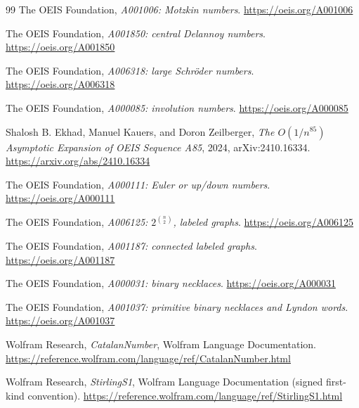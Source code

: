 \documentclass[11pt,a4paper]{article}
\numberwithin{equation}{section}
\theoremstyle{definition}
\theoremstyle{remark}
\begin{document}
\begin{thebibliography}{99}
The OEIS Foundation, \emph{A001006: Motzkin numbers}.\newline
\url{https://oeis.org/A001006}

The OEIS Foundation, \emph{A001850: central Delannoy numbers}.\newline
\url{https://oeis.org/A001850}

The OEIS Foundation, \emph{A006318: large Schr\"oder numbers}.\newline
\url{https://oeis.org/A006318}

The OEIS Foundation, \emph{A000085: involution numbers}.\newline
\url{https://oeis.org/A000085}

Shalosh B. Ekhad, Manuel Kauers, and Doron Zeilberger,
\emph{The $O(1/n^{85})$ Asymptotic Expansion of OEIS Sequence A85}, 2024,
arXiv:2410.16334.\newline
\url{https://arxiv.org/abs/2410.16334}

The OEIS Foundation, \emph{A000111: Euler or up/down numbers}.\newline
\url{https://oeis.org/A000111}

The OEIS Foundation, \emph{A006125: $2^{\binom n2}$, labeled graphs}.\newline
\url{https://oeis.org/A006125}

The OEIS Foundation, \emph{A001187: connected labeled graphs}.\newline
\url{https://oeis.org/A001187}

The OEIS Foundation, \emph{A000031: binary necklaces}.\newline
\url{https://oeis.org/A000031}

The OEIS Foundation, \emph{A001037: primitive binary necklaces and Lyndon words}.\newline
\url{https://oeis.org/A001037}

Wolfram Research, \emph{CatalanNumber}, Wolfram Language Documentation.\newline
\url{https://reference.wolfram.com/language/ref/CatalanNumber.html}

Wolfram Research, \emph{StirlingS1}, Wolfram Language Documentation (signed first-kind convention).\newline
\url{https://reference.wolfram.com/language/ref/StirlingS1.html}


\end{thebibliography}
\end{document}
